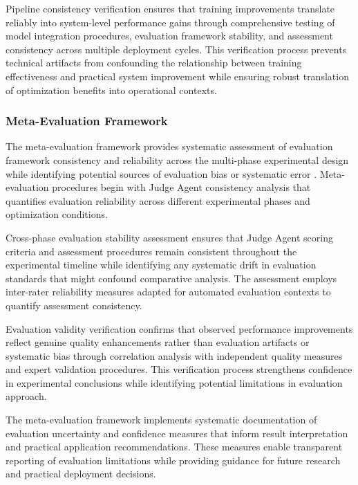 Pipeline consistency verification ensures that training improvements translate reliably into system-level performance gains through comprehensive testing of model integration procedures, evaluation framework stability, and assessment consistency across multiple deployment cycles. This verification process prevents technical artifacts from confounding the relationship between training effectiveness and practical system improvement while ensuring robust translation of optimization benefits into operational contexts.

\subsubsection{Meta-Evaluation Framework}

The meta-evaluation framework provides systematic assessment of evaluation framework consistency and reliability across the multi-phase experimental design while identifying potential sources of evaluation bias or systematic error \cite{wang2024dynamic_evaluation}. Meta-evaluation procedures begin with Judge Agent consistency analysis that quantifies evaluation reliability across different experimental phases and optimization conditions.

Cross-phase evaluation stability assessment ensures that Judge Agent scoring criteria and assessment procedures remain consistent throughout the experimental timeline while identifying any systematic drift in evaluation standards that might confound comparative analysis. The assessment employs inter-rater reliability measures adapted for automated evaluation contexts to quantify assessment consistency.

Evaluation validity verification confirms that observed performance improvements reflect genuine quality enhancements rather than evaluation artifacts or systematic bias through correlation analysis with independent quality measures and expert validation procedures. This verification process strengthens confidence in experimental conclusions while identifying potential limitations in evaluation approach.

The meta-evaluation framework implements systematic documentation of evaluation uncertainty and confidence measures that inform result interpretation and practical application recommendations. These measures enable transparent reporting of evaluation limitations while providing guidance for future research and practical deployment decisions.

